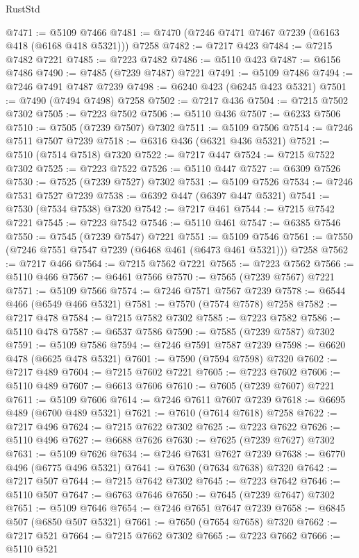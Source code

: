 \begin{lexlean}{RustStd}
\begin{coremodule}
@7471 := @5109 @7466
@7481 := @7470 (@7246 @7471 @7467 @7239 (@6163 @418 (@6168 @418 @5321))) @7258
@7482 := @7217 @423
@7484 := @7215 @7482 @7221
@7485 := @7223 @7482
@7486 := @5110 @423
@7487 := @6156 @7486
@7490 := @7485 (@7239 @7487) @7221
@7491 := @5109 @7486
@7494 := @7246 @7491 @7487 @7239
@7498 := @6240 @423 (@6245 @423 @5321)
@7501 := @7490 (@7494 @7498) @7258
@7502 := @7217 @436
@7504 := @7215 @7502 @7302
@7505 := @7223 @7502
@7506 := @5110 @436
@7507 := @6233 @7506
@7510 := @7505 (@7239 @7507) @7302
@7511 := @5109 @7506
@7514 := @7246 @7511 @7507 @7239
@7518 := @6316 @436 (@6321 @436 @5321)
@7521 := @7510 (@7514 @7518) @7320
@7522 := @7217 @447
@7524 := @7215 @7522 @7302
@7525 := @7223 @7522
@7526 := @5110 @447
@7527 := @6309 @7526
@7530 := @7525 (@7239 @7527) @7302
@7531 := @5109 @7526
@7534 := @7246 @7531 @7527 @7239
@7538 := @6392 @447 (@6397 @447 @5321)
@7541 := @7530 (@7534 @7538) @7320
@7542 := @7217 @461
@7544 := @7215 @7542 @7221
@7545 := @7223 @7542
@7546 := @5110 @461
@7547 := @6385 @7546
@7550 := @7545 (@7239 @7547) @7221
@7551 := @5109 @7546
@7561 := @7550 (@7246 @7551 @7547 @7239 (@6468 @461 (@6473 @461 @5321))) @7258
@7562 := @7217 @466
@7564 := @7215 @7562 @7221
@7565 := @7223 @7562
@7566 := @5110 @466
@7567 := @6461 @7566
@7570 := @7565 (@7239 @7567) @7221
@7571 := @5109 @7566
@7574 := @7246 @7571 @7567 @7239
@7578 := @6544 @466 (@6549 @466 @5321)
@7581 := @7570 (@7574 @7578) @7258
@7582 := @7217 @478
@7584 := @7215 @7582 @7302
@7585 := @7223 @7582
@7586 := @5110 @478
@7587 := @6537 @7586
@7590 := @7585 (@7239 @7587) @7302
@7591 := @5109 @7586
@7594 := @7246 @7591 @7587 @7239
@7598 := @6620 @478 (@6625 @478 @5321)
@7601 := @7590 (@7594 @7598) @7320
@7602 := @7217 @489
@7604 := @7215 @7602 @7221
@7605 := @7223 @7602
@7606 := @5110 @489
@7607 := @6613 @7606
@7610 := @7605 (@7239 @7607) @7221
@7611 := @5109 @7606
@7614 := @7246 @7611 @7607 @7239
@7618 := @6695 @489 (@6700 @489 @5321)
@7621 := @7610 (@7614 @7618) @7258
@7622 := @7217 @496
@7624 := @7215 @7622 @7302
@7625 := @7223 @7622
@7626 := @5110 @496
@7627 := @6688 @7626
@7630 := @7625 (@7239 @7627) @7302
@7631 := @5109 @7626
@7634 := @7246 @7631 @7627 @7239
@7638 := @6770 @496 (@6775 @496 @5321)
@7641 := @7630 (@7634 @7638) @7320
@7642 := @7217 @507
@7644 := @7215 @7642 @7302
@7645 := @7223 @7642
@7646 := @5110 @507
@7647 := @6763 @7646
@7650 := @7645 (@7239 @7647) @7302
@7651 := @5109 @7646
@7654 := @7246 @7651 @7647 @7239
@7658 := @6845 @507 (@6850 @507 @5321)
@7661 := @7650 (@7654 @7658) @7320
@7662 := @7217 @521
@7664 := @7215 @7662 @7302
@7665 := @7223 @7662
@7666 := @5110 @521

\end{coremodule}
\end{lexlean}
